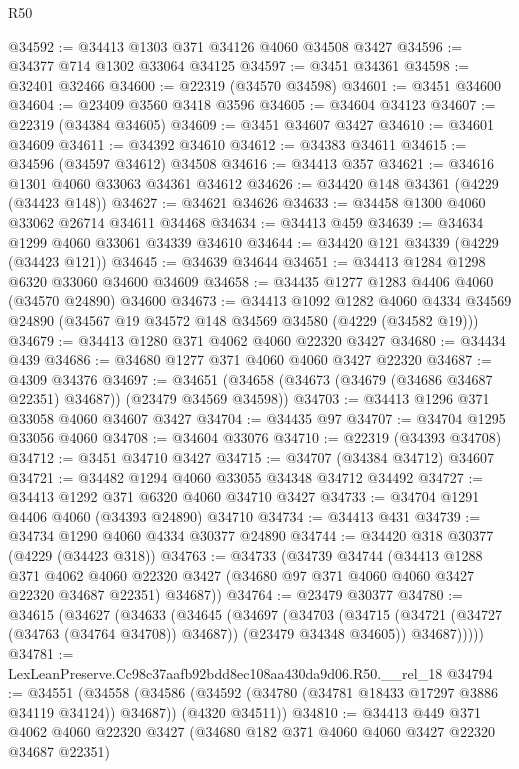 \begin{lexlean}{R50}
\begin{coremodule}
@34592 := @34413 @1303 @371 @34126 @4060 @34508 @3427
@34596 := @34377 @714 @1302 @33064 @34125
@34597 := @3451 @34361
@34598 := @32401 @32466
@34600 := @22319 (@34570 @34598)
@34601 := @3451 @34600
@34604 := @23409 @3560 @3418 @3596
@34605 := @34604 @34123
@34607 := @22319 (@34384 @34605)
@34609 := @3451 @34607 @3427
@34610 := @34601 @34609
@34611 := @34392 @34610
@34612 := @34383 @34611
@34615 := @34596 (@34597 @34612) @34508
@34616 := @34413 @357
@34621 := @34616 @1301 @4060 @33063 @34361 @34612
@34626 := @34420 @148 @34361 (@4229 (@34423 @148))
@34627 := @34621 @34626
@34633 := @34458 @1300 @4060 @33062 @26714 @34611 @34468
@34634 := @34413 @459
@34639 := @34634 @1299 @4060 @33061 @34339 @34610
@34644 := @34420 @121 @34339 (@4229 (@34423 @121))
@34645 := @34639 @34644
@34651 := @34413 @1284 @1298 @6320 @33060 @34600 @34609
@34658 := @34435 @1277 @1283 @4406 @4060 (@34570 @24890) @34600
@34673 := @34413
    @1092
    @1282
    @4060
    @4334
    @34569
    @24890
    (@34567 @19 @34572 @148 @34569 @34580 (@4229 (@34582 @19)))
@34679 := @34413 @1280 @371 @4062 @4060 @22320 @3427
@34680 := @34434 @439
@34686 := @34680 @1277 @371 @4060 @4060 @3427 @22320
@34687 := @4309 @34376
@34697 := @34651 (@34658 (@34673 (@34679 (@34686 @34687 @22351) @34687)) (@23479 @34569 @34598))
@34703 := @34413 @1296 @371 @33058 @4060 @34607 @3427
@34704 := @34435 @97
@34707 := @34704 @1295 @33056 @4060
@34708 := @34604 @33076
@34710 := @22319 (@34393 @34708)
@34712 := @3451 @34710 @3427
@34715 := @34707 (@34384 @34712) @34607
@34721 := @34482 @1294 @4060 @33055 @34348 @34712 @34492
@34727 := @34413 @1292 @371 @6320 @4060 @34710 @3427
@34733 := @34704 @1291 @4406 @4060 (@34393 @24890) @34710
@34734 := @34413 @431
@34739 := @34734 @1290 @4060 @4334 @30377 @24890
@34744 := @34420 @318 @30377 (@4229 (@34423 @318))
@34763 := @34733
    (@34739
      @34744
      (@34413
        @1288
        @371
        @4062
        @4060
        @22320
        @3427
        (@34680 @97 @371 @4060 @4060 @3427 @22320 @34687 @22351)
        @34687))
@34764 := @23479 @30377
@34780 := @34615
    (@34627
      (@34633
        (@34645
          (@34697
            (@34703
              (@34715 (@34721 (@34727 (@34763 (@34764 @34708)) @34687)) (@23479 @34348 @34605))
              @34687)))))
@34781 := LexLeanPreserve.Cc98c37aafb92bdd8ec108aa430da9d06.R50.__rel_18
@34794 := @34551
    (@34558
      (@34586 (@34592 (@34780 (@34781 @18433 @17297 @3886 @34119 @34124)) @34687))
      (@4320 @34511))
@34810 := @34413
    @449
    @371
    @4062
    @4060
    @22320
    @3427
    (@34680 @182 @371 @4060 @4060 @3427 @22320 @34687 @22351)

\end{coremodule}
\end{lexlean}
